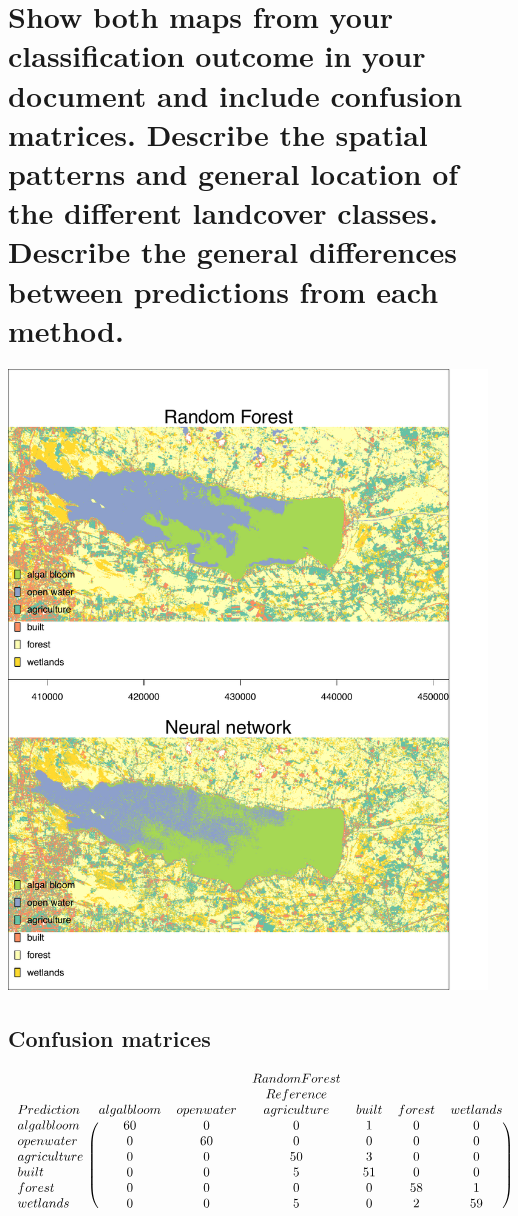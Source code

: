 \documentclass[11pt]{article}
\begin{document}
\section{Show both maps from your classification outcome in your document and include confusion matrices. Describe the spatial patterns and general location of the different landcover classes. Describe the general differences between predictions from each method.}

\begin{center}
\includegraphics[width = 5in]{plots.pdf}
\end{center}

\subsection*{Confusion matrices}
\[
\begin{blockarray}{lcccccc}
& & & Random Forest & & & \\
& & & Reference & & & \\
Prediction & algal bloom & open water & agriculture & built & forest & wetlands\\
\begin{block}{l(cccccc)}
algal bloom & 60 & 0 & 0 & 1 & 0 & 0 \\
open water & 0 & 60 & 0 & 0 & 0 & 0 \\
agriculture & 0 & 0 & 50 & 3 & 0 & 0  \\
built & 0 & 0 & 5 & 51 & 0 & 0  \\
forest & 0 & 0 & 0 & 0 & 58 & 1 \\
wetlands & 0 & 0 & 5 & 0 & 2 & 59 \\
\end{block}
\end{blockarray}
 \]
 
\end{document}
